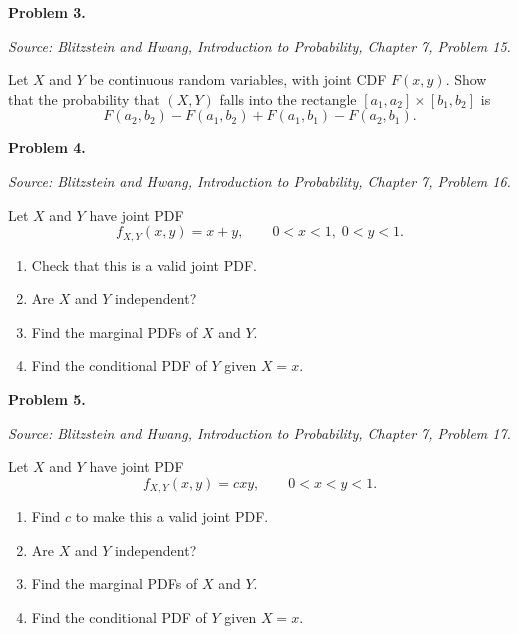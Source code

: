 \documentclass[11pt]{article}
\newcommand{\source}[2]{%
    \vspace{0.15cm}
    {\small\textit{Source: Blitzstein and Hwang, \textit{Introduction to Probability}, Chapter #1, Problem #2.}}
}
\begin{document}
\newpage

 
\begin{problemheader}
\textbf{Problem 3.}
\end{problemheader}
\source{7}{15}

Let $X$ and $Y$ be continuous random variables, with joint CDF $F(x,y)$. Show that the probability that $(X,Y)$ falls into the rectangle $[a_1,a_2]\times[b_1,b_2]$ is
\[
F(a_2,b_2)-F(a_1,b_2)+F(a_1,b_1)-F(a_2,b_1).
\]


\newpage


\begin{problemheader}
\textbf{Problem 4.  }
\end{problemheader}
\source{7}{16}

Let $X$ and $Y$ have joint PDF
\[
f_{X,Y}(x,y)=x+y,\qquad 0<x<1,\;0<y<1.
\]

\begin{enumerate}[label=(\alph*), leftmargin=*]
    \item Check that this is a valid joint PDF.

    \item Are $X$ and $Y$ independent?

    \item Find the marginal PDFs of $X$ and $Y$.

    \item Find the conditional PDF of $Y$ given $X=x$.
\end{enumerate}

\newpage


\begin{problemheader}
\textbf{Problem 5. }
\end{problemheader}
\source{7}{17}

Let $X$ and $Y$ have joint PDF
\[
f_{X,Y}(x,y)=cxy,\qquad 0<x<y<1.
\]

\begin{enumerate}[label=(\alph*), leftmargin=*]
    \item Find $c$ to make this a valid joint PDF.

    \item Are $X$ and $Y$ independent?

    \item Find the marginal PDFs of $X$ and $Y$.

    \item Find the conditional PDF of $Y$ given $X=x$.
\end{enumerate}
\end{document}
